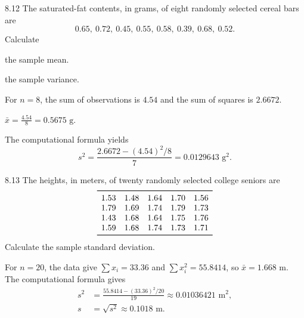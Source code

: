 \documentclass[11pt,oneside]{article}
\begin{document}
\begin{exercise}{8.12}
The saturated-fat contents, in grams, of eight randomly selected cereal bars are
\[
0.65, \ 0.72, \ 0.45, \ 0.55, \ 0.58, \ 0.39, \ 0.68, \ 0.52.
\]
Calculate
\begin{exercisesubparts}
\item the sample mean.
\item the sample variance.
\end{exercisesubparts}
\end{exercise}
\begin{solution}
For $n=8$, the sum of observations is $4.54$ and the sum of squares is $2.6672$.
\begin{exercisesubparts}
\item $\displaystyle\bar x=\frac{4.54}{8}=\boxed{0.5675\text{ g}}$.
\item The computational formula yields
\[
s^2=\frac{2.6672-(4.54)^2/8}{7}
=\boxed{0.0129643\text{ g}^2}.
\]
\end{exercisesubparts}
\end{solution}

\begin{exercise}{8.13}
The heights, in meters, of twenty randomly selected college seniors are
\[
\begin{array}{ccccc}
\toprule
1.53&1.48&1.64&1.70&1.56\\
1.79&1.69&1.74&1.79&1.73\\
1.43&1.68&1.64&1.75&1.76\\
1.59&1.68&1.74&1.73&1.71\\
\bottomrule
\end{array}
\]
Calculate the sample standard deviation.
\end{exercise}
\begin{solution}
For $n=20$, the data give $\displaystyle \sum x_i=33.36$ and $\displaystyle \sum x_i^2=55.8414$, so $\bar x=1.668$ m. The computational formula gives
\[
\begin{aligned}
s^2&=\frac{55.8414-(33.36)^2/20}{19}
\approx0.01036421\text{ m}^2, \\
s&=\boxed{\sqrt{s^2}\approx0.1018\text{ m}}.
\end{aligned}
\]
\end{solution}
\end{document}
